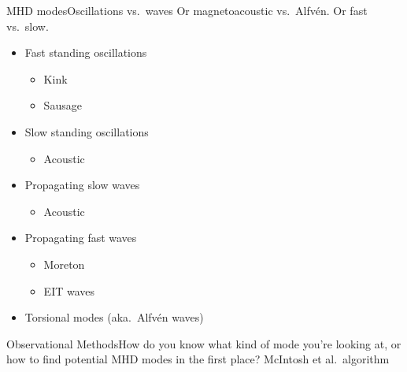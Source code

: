 \documentclass[table]{beamer}
\begin{document}
\begin{frame}{MHD modes}{Oscillations vs.\ waves}
    Or magnetoacoustic vs.\ Alfv\'en.
    Or fast vs.\ slow.
    \begin{itemize}
        \item Fast standing oscillations
            \begin{itemize}
                \item Kink
                \item Sausage
            \end{itemize}
        \item Slow standing oscillations
            \begin{itemize}
                \item Acoustic
            \end{itemize}
        \item Propagating slow waves
            \begin{itemize}
                \item Acoustic
            \end{itemize}
        \item Propagating fast waves
            \begin{itemize}
                \item Moreton
                \item EIT waves
            \end{itemize}
        \item Torsional modes (aka.\ Alfv\'en waves)
    \end{itemize}
\end{frame}%
\begin{frame}{Observational Methods}{How do you know what kind of mode
    you're looking at, or how to find potential MHD modes in the first place?}
    McIntosh et al.\ algorithm
\end{frame}%
\end{document}
